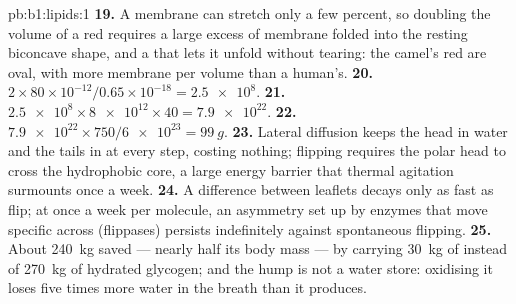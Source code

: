 \begin{solution}{pb:b1:lipids:1}
\textbf{19.} A membrane can stretch only a few percent, so doubling the
volume of a red  requires a large excess of membrane folded into
the resting biconcave shape, and a  that lets it unfold
without tearing: the camel's red  are oval, with more membrane per
volume than a human's.
\textbf{20.} $2\times 80\times 10^{-12}/0.65\times 10^{-18} = \num{2.5e8}$.
\textbf{21.} $\num{2.5e8}\times\num{8e12}\times 40 = \num{7.9e22}$.
\textbf{22.} $\num{7.9e22}\times 750/\num{6e23} = \qty{99}{g}$.
\textbf{23.} Lateral diffusion keeps the head in water and the tails in
 at every step, costing nothing; flipping requires the polar head to
cross the hydrophobic core, a large energy barrier that thermal
agitation surmounts once a week.
\textbf{24.} A difference between leaflets decays only as fast as
 flip; at once a week per molecule, an asymmetry set up by
enzymes that move specific  across (flippases) persists
indefinitely against spontaneous flipping.
\textbf{25.} About \qty{240}{kg} saved --- nearly half its body mass
--- by carrying \qty{30}{kg} of  instead of \qty{270}{kg} of hydrated
glycogen; and the hump is not a water store: oxidising it loses five
times more water in the breath than it produces.
\end{solution}
